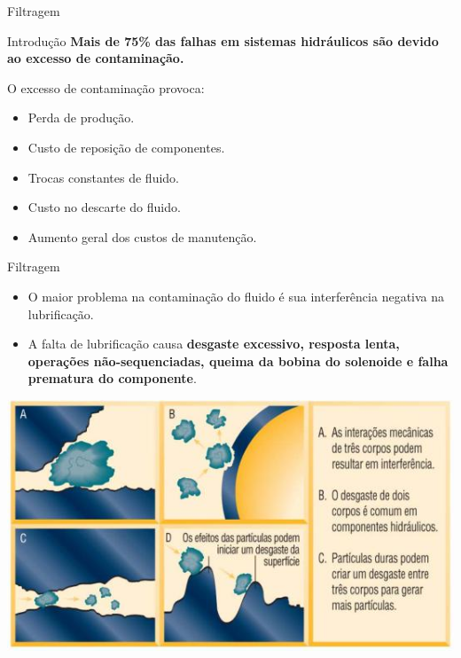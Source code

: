\begin{frame}{Filtragem}
	\begin{block}{Introdução}
		\textbf{Mais de 75\% das falhas em sistemas hidráulicos são devido ao excesso de contaminação.}
		
		\smallskip
		
		O excesso de contaminação provoca:
		\begin{itemize}
			\item Perda de produção.
			\item Custo de reposição de componentes.
			\item Trocas constantes de fluido.
			\item Custo no descarte do fluido.
			\item Aumento geral dos custos de manutenção.
		\end{itemize}
	\end{block}
\end{frame}


\begin{frame}{Filtragem}
	\begin{block}{}
		\begin{itemize}
			\item O maior problema na contaminação do fluido é sua interferência negativa na lubrificação.
			\item A falta de lubrificação causa \textbf{desgaste excessivo, resposta lenta, operações não-sequenciadas, queima da bobina do solenoide e falha prematura do componente}.
		\end{itemize}
	\end{block}

	\centering
	\includegraphics[width=0.7\linewidth]{Figuras/Ch15/fig15}
	
\end{frame}


